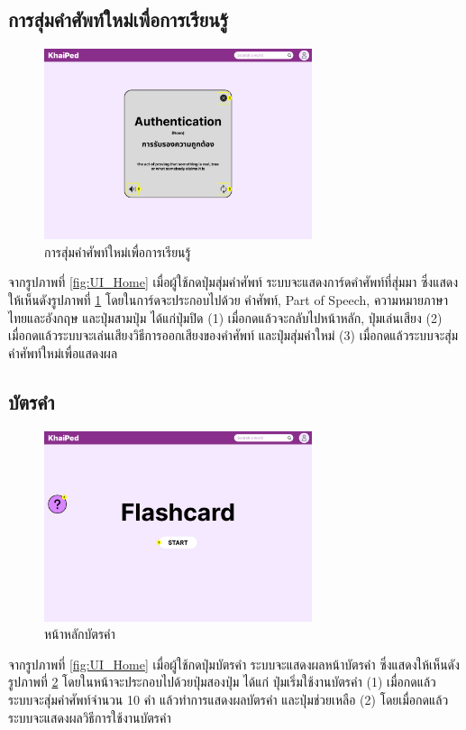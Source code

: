 \documentclass[12pt,oneside,openright,a4paper]{cpe-thai-project}
\begin{document}
\pagebreak
\subsection{การสุ่มคำศัพท์ใหม่เพื่อการเรียนรู้}
\begin{figure}[!h]\centering
	\includegraphics[width=0.7\textwidth, keepaspectratio=true]{image/chap3/ui/Random Word.png}
	\caption{การสุ่มคำศัพท์ใหม่เพื่อการเรียนรู้}\label{fig:UI_RandomWord}
\end{figure}
\hspace{1cm}
จากรูปภาพที่ \ref{fig:UI_Home} เมื่อผู้ใช้กดปุ่มสุ่มคำศัพท์ ระบบจะแสดงการ์ดคำศัพท์ที่สุ่มมา ซึ่งแสดงให้เห็นดังรูปภาพที่ \ref{fig:UI_RandomWord}
โดยในการ์ดจะประกอบไปด้วย คำศัพท์, Part of Speech, ความหมายภาษาไทยและอังกฤษ และปุ่มสามปุ่ม ได้แก่ปุ่มปิด (1)
เมื่อกดแล้วจะกลับไปหน้าหลัก, ปุ่มเล่นเสียง (2) เมื่อกดแล้วระบบจะเล่นเสียงวิธีการออกเสียงของคำศัพท์ และปุ่มสุ่มคำใหม่ (3) เมื่อกดแล้วระบบจะสุ่มคำศัพท์ใหม่เพื่อแสดงผล

\pagebreak
\subsection{บัตรคำ}
\begin{figure}[!h]\centering
	\includegraphics[width=0.7\textwidth, keepaspectratio=true]{image/chap3/ui/flashcard/Flashcard.png}
	\caption{หน้าหลักบัตรคำ}\label{fig:UI_Flashcard}
\end{figure}
\hspace{1cm}
จากรูปภาพที่ \ref{fig:UI_Home} เมื่อผู้ใช้กดปุ่มบัตรคำ ระบบจะแสดงผลหน้าบัตรคำ ซึ่งแสดงให้เห็นดังรูปภาพที่ \ref{fig:UI_Flashcard}
โดยในหน้าจะประกอบไปด้วยปุ่มสองปุ่ม ได้แก่ ปุ่มเริ่มใช้งานบัตรคำ (1) เมื่อกดแล้ว ระบบจะสุ่มคำศัพท์จำนวน 10 คำ
แล้วทำการแสดงผลบัตรคำ และปุ่มช่วยเหลือ (2) โดยเมื่อกดแล้ว ระบบจะแสดงผลวิธีการใช้งานบัตรคำ
\end{document}
